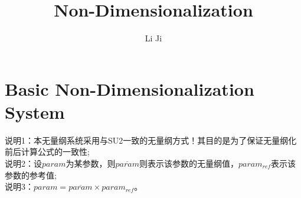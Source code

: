 \documentclass[a4paper,11pt]{article}
\title{Non-Dimensionalization}
\author{Li Ji}
\begin{document}
\maketitle
\tableofcontents

\begin{abstract}
\end{abstract}

\section{Basic Non-Dimensionalization System}
说明1：本无量纲系统采用与SU2一致的无量纲方式！其目的是为了保证无量纲化前后计算公式的一致性; \\
说明2：设$param$为某参数，则$\overline{param}$则表示该参数的无量纲值，$param_{ref}$表示该参数的参考值;\\
说明3：$param=\overline{param} \times param_{ref}$。
\end{document}

